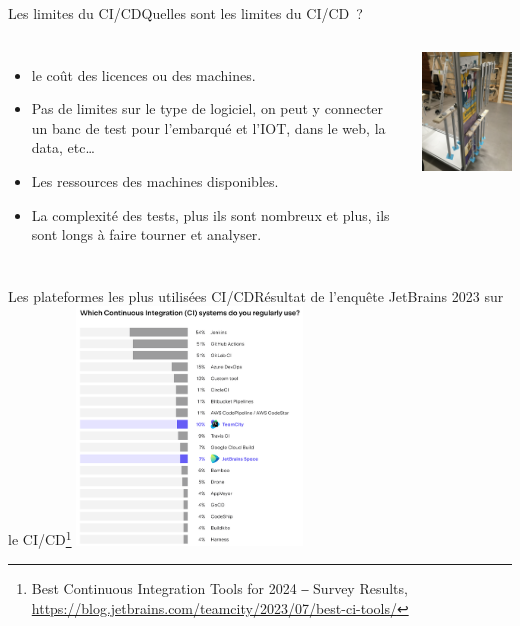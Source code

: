 \documentclass{beamer}
\begin{document}
    \begin{frame}{Les limites du CI/CD}{Quelles sont les limites du CI/CD~?}
        \transdissolve
        \pause
        \begin{columns}
            \begin{itemize}
                \item le coût des licences ou des machines.
                \item Pas de limites sur le type de logiciel, on peut y connecter un banc de test pour l'embarqué et l'IOT, dans le web, la data, etc\ldots
                \item Les ressources des machines disponibles.
                \item La complexité des tests, plus ils sont nombreux et plus, ils sont longs à faire tourner et analyser.
            \end{itemize}
            \centering
            \includegraphics[width=5cm]{image/somfy-test-bench}
        \end{columns}
    \end{frame}

    \begin{frame}{Les plateformes les plus utilisées CI/CD}{Résultat de l'enquête JetBrains 2023 sur le CI/CD\footnote{Best Continuous Integration Tools for 2024 ‒ Survey Results, \url{https://blog.jetbrains.com/teamcity/2023/07/best-ci-tools/}}}
        \transdissolve
        \centering
        \includegraphics[width=6cm]{image/ci-jetbrains-survey}
    \end{frame}
\end{document}
